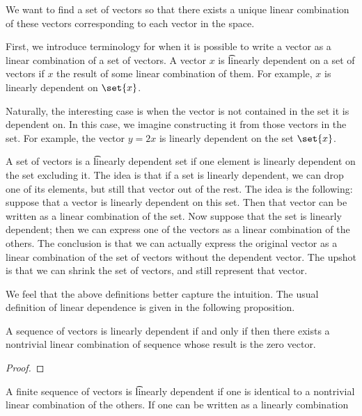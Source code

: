 

We want to find a set of vectors so that there exists a unique linear combination of these vectors corresponding to each vector in the space.


First, we introduce terminology for when it is possible to write a vector as a linear combination of a set of vectors.
A vector $x$ is \t{linearly dependent on a set of vectors} if $x$ the result of some linear combination of them.
For example, $x$ is linearly dependent on $\set{x}$.

Naturally, the interesting case is when the vector is not contained in the set it is dependent on.
In this case, we imagine constructing it from those vectors in the set.
For example, the vector $y = 2x$ is linearly dependent on the set $\set{x}$.

A set of vectors is a \t{linearly dependent set} if one element is linearly dependent on the set excluding it.
The idea is that if a set is linearly dependent, we can drop one of its elements, but still  that vector out of the rest.
The idea is the following: suppose that a vector is linearly dependent on this set.
Then that vector can be written as a linear combination of the set.
Now suppose that the set is linearly dependent; then we can express one of the vectors as a linear combination of the others.
The conclusion is that we can actually express the original vector as a linear combination of the set of vectors without the dependent vector.
The upshot is that we can shrink the set of vectors, and still represent that vector.

We feel that the above definitions better capture the intuition.
The usual definition of linear dependence is given in the following proposition.
\begin{prop}
  A sequence of vectors is linearly dependent if and only if then there exists a nontrivial linear combination of sequence whose result is the zero vector.
  \begin{proof}

  \end{proof}

\end{prop}
A finite sequence of vectors is \t{linearly dependent} if one is identical to a nontrivial linear combination of the others.
If one can be written as a linearly combination

